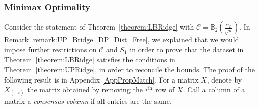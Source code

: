 \documentclass{article}
\begin{document}
\subsubsection{Minimax Optimality}


Consider the statement of Theorem~\ref{theorem:LBRidge} with $\mathcal{C} = \mathbb{B}_2\left(\frac{\alpha_2}{\sqrt{p}}\right)$. In Remark \ref{remark:UP_Bridge_DP_Dist_Free}, we explained that we would impose further restrictions on $\mathcal{C}$ and $S_1$ in order to prove that the dataset in Theorem~\ref{theorem:LBRidge} satisfies the conditions in Theorem~\ref{theorem:UPRidge}, in order to reconcile the bounds.
The proof of the following result is in Appendix \ref{AppPropMatch}. For a matrix $X$, denote by $X_{(-i)}$ the matrix obtained by removing the $i^{\text{th}}$ row of $X$. Call a column of a matrix a \emph{consensus column} if all entries are the same.
\end{document}
